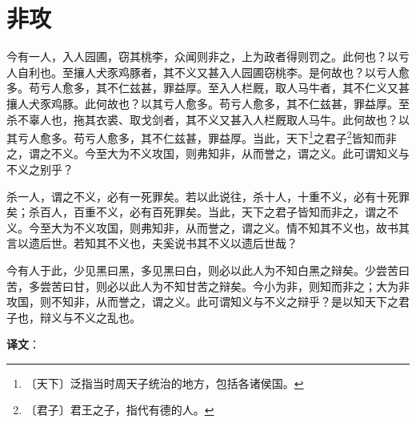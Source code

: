 \documentclass[12pt,UTF-8,openany]{ctexbook}
\begin{document}
\chapter{非攻}

\begin{normalsize}
    
    今有一人，入人园圃，窃其桃李，众闻则非之，上为政者得则罚之。此何也？以亏人自利也。至攘人犬豕鸡豚者，其不义又甚入人园圃窃桃李。是何故也？以亏人愈多。苟亏人愈多，其不仁兹甚，罪益厚。至入人栏厩，取人马牛者，其不仁义又甚攘人犬豕鸡豚。此何故也？以其亏人愈多。苟亏人愈多，其不仁兹甚，罪益厚。至杀不辜人也，拖其衣裘、取戈剑者，其不义又甚入人栏厩取人马牛。此何故也？以其亏人愈多。苟亏人愈多，其不仁兹甚，罪益厚。当此，天下\footnote{〔天下〕泛指当时周天子统治的地方，包括各诸侯国。}之君子\footnote{〔君子〕君王之子，指代有德的人。}皆知而非之，谓之不义。今至大为不义攻国，则弗知非，从而誉之，谓之义。此可谓知义与不义之别乎？
    
    杀一人，谓之不义，必有一死罪矣。若以此说往，杀十人，十重不义，必有十死罪矣；杀百人，百重不义，必有百死罪矣。当此，天下之君子皆知而非之，谓之不义。今至大为不义攻国，则弗知非，从而誉之，谓之义。情不知其不义也，故书其言以遗后世。若知其不义也，夫奚说书其不义以遗后世哉？
    
    今有人于此，少见黑曰黑，多见黑曰白，则必以此人为不知白黑之辩矣。少尝苦曰苦，多尝苦曰甘，则必以此人为不知甘苦之辩矣。今小为非，则知而非之；大为非攻国，则不知非，从而誉之，谓之义。此可谓知义与不义之辩乎？是以知天下之君子也，辩义与不义之乱也。
\end{normalsize}


\newpage

\textbf{译文}：

\vspace{1em}
\end{document}
